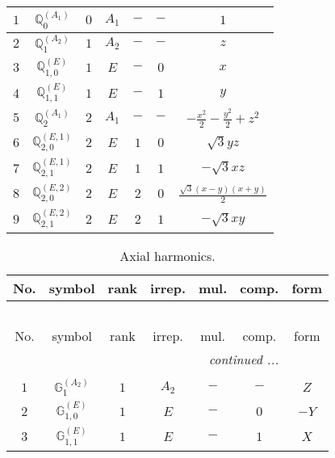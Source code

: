 \documentclass[fleqn,10pt,landscape]{article}
\begin{document}
\begin{itemize}
\begin{center}
\begin{longtable}{ccccccc}
$ 1 $ & $ \mathbb{Q}_{0}^{(A_{1})} $ & $ 0 $ & $ A_{1} $ & $ - $ & $ - $ & $ 1 $ \\ \hline
$ 2 $ & $ \mathbb{Q}_{1}^{(A_{2})} $ & $ 1 $ & $ A_{2} $ & $ - $ & $ - $ & $ z $ \\
$ 3 $ & $ \mathbb{Q}_{1,0}^{(E)} $ & $ 1 $ & $ E $ & $ - $ & $ 0 $ & $ x $ \\
$ 4 $ & $ \mathbb{Q}_{1,1}^{(E)} $ & $ 1 $ & $ E $ & $ - $ & $ 1 $ & $ y $ \\ \hline
$ 5 $ & $ \mathbb{Q}_{2}^{(A_{1})} $ & $ 2 $ & $ A_{1} $ & $ - $ & $ - $ & $ - \frac{x^{2}}{2} - \frac{y^{2}}{2} + z^{2} $ \\
$ 6 $ & $ \mathbb{Q}_{2,0}^{(E,1)} $ & $ 2 $ & $ E $ & $ 1 $ & $ 0 $ & $ \sqrt{3} y z $ \\
$ 7 $ & $ \mathbb{Q}_{2,1}^{(E,1)} $ & $ 2 $ & $ E $ & $ 1 $ & $ 1 $ & $ - \sqrt{3} x z $ \\
$ 8 $ & $ \mathbb{Q}_{2,0}^{(E,2)} $ & $ 2 $ & $ E $ & $ 2 $ & $ 0 $ & $ \frac{\sqrt{3} \left(x - y\right) \left(x + y\right)}{2} $ \\
$ 9 $ & $ \mathbb{Q}_{2,1}^{(E,2)} $ & $ 2 $ & $ E $ & $ 2 $ & $ 1 $ & $ - \sqrt{3} x y $ \\
\end{longtable}
\end{center}
\begin{center}
\renewcommand{\arraystretch}{1.3}
\begin{longtable}{ccccccc}
\caption{Axial harmonics.}
 \\
 \hline \hline
No. & symbol & rank & irrep. & mul. & comp. & form \\ \hline \endfirsthead

\multicolumn{6}{l}{\tablename\ \thetable{}} \\
 \hline \hline
No. & symbol & rank & irrep. & mul. & comp. & form \\ \hline \endhead

 \hline \hline
\multicolumn{6}{r}{\footnotesize\it continued ...} \\ \endfoot

 \hline \hline
\multicolumn{6}{r}{} \\ \endlastfoot

$ 1 $ & $ \mathbb{G}_{1}^{(A_{2})} $ & $ 1 $ & $ A_{2} $ & $ - $ & $ - $ & $ Z $ \\
$ 2 $ & $ \mathbb{G}_{1,0}^{(E)} $ & $ 1 $ & $ E $ & $ - $ & $ 0 $ & $ - Y $ \\
$ 3 $ & $ \mathbb{G}_{1,1}^{(E)} $ & $ 1 $ & $ E $ & $ - $ & $ 1 $ & $ X $ \\
\end{longtable}
\end{center}


\end{itemize}
\end{document}
